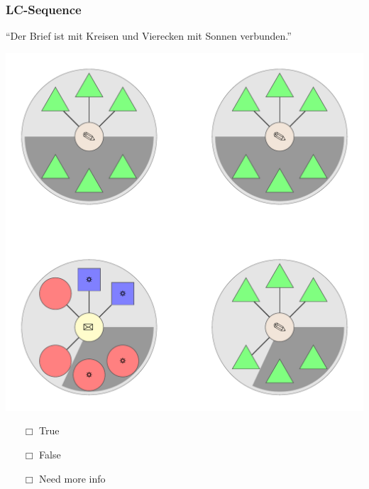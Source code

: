 \documentclass[fleqn,10pt,xcolor=dvipsnames]{beamer}
\newcommand{\LC}{LC\xspace}
\newcommand{\mymark}[1]{{\color{mycol}{#1}}}
\begin{document}
\begin{frame}
  \frametitle{\LC-Sequence}
  \begin{center}
    ``Der Brief ist mit Kreisen und Vierecken mit Sonnen verbunden.''

    \vspace{0.1cm}

    \includegraphics[width=0.5 \textwidth]{../../pictures/lc_01_4.pdf}

    \vspace{0.1cm}

    \begin{multicols}{3}
      \begin{itemize} 
      \item[$\Box$] True\\
        \onslide<2>{$\leadsto$  \mymark{false}}
      \item[$\Box$] False\\
        \onslide<2>{$\leadsto$ \mymark{false}}
      \item[$\Box$] Need more info 
      \end{itemize}
    \end{multicols}

  \end{center}
\end{frame}
\end{document}
